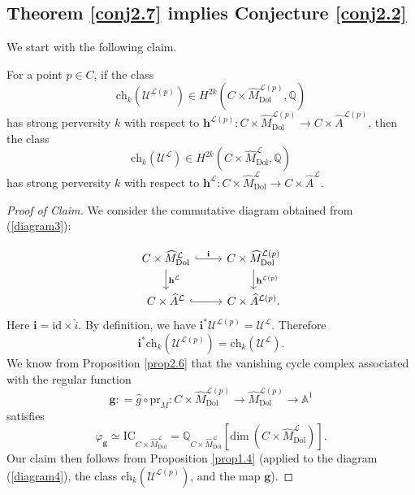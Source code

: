 \documentclass[11pt]{amsart}
\theoremstyle{plain}
\newtheorem{prop}[thm]{Proposition}
\theoremstyle{definition}
\theoremstyle{remark}
\newcommand{\BA}{{\mathbb{A}}}
\newcommand{\BQ}{{\mathbb{Q}}}
\newcommand{\CL}{{\mathcal L}}
\newcommand{\CU}{{\mathcal U}}
\begin{document}
\subsection{Theorem \ref{conj2.7} implies Conjecture \ref{conj2.2}}\label{Sec2.3} We start with the following claim.


\medskip
{} For a point $p\in C$, if the class
\[
\mathrm{ch}_k(\CU^{\CL(p)}) \in H^{2k}(C\times \widehat{M}^{\CL(p)}_{\mathrm{Dol}}, \BQ) 
\]
has strong perversity $k$ with respect to $\mathbf{h}^{\CL(p)}: C\times \widehat{M}^{\CL(p)}_{\mathrm{Dol}} \to C\times \widehat{A}^{\CL(p)}$, then the class
\[
\mathrm{ch}_k(\CU^{\CL}) \in H^{2k}(C\times \widehat{M}^{\CL}_{\mathrm{Dol}}, \BQ)
\]
has strong perversity $k$ with respect to $\mathbf{h}^{\CL}: C\times \widehat{M}^\CL_{\mathrm{Dol}} \to C\times \widehat{A}^\CL$.

\begin{proof}[Proof of Claim]

We consider the commutative diagram obtained from (\ref{diagram3}):

\begin{equation}\label{diagram4}
\begin{tikzcd}
C \times \widehat{M}^\CL_{\mathrm{Dol}}\arrow[r,hook, "\mathbf{i}"] \arrow[d, "\mathbf{h}^\CL"]
&C\times \widehat{M}^{\CL(p)}_{\mathrm{Dol}} \arrow[d, "\mathbf{h}^{\CL(p)}"] \\
C\times \widehat{A}^\CL \arrow[r,hook]
& C\times \widehat{A}^{\CL(p)}.
\end{tikzcd}
\end{equation}
Here $\mathbf{i} = \mathrm{id} \times \widehat{i}$. By definition,  we have $\mathbf{i}^* \CU^{\CL(p)} = \CU^{\CL}$. Therefore 
\[
\mathbf{i}^* \mathrm{ch}_k(\CU^{\CL(p)}) = \mathrm{ch}_k(\CU^\CL).
\]
We know from Proposition \ref{prop2.6} that the vanishing cycle complex associated with the regular function
\[
\mathbf{g}: =  \widehat{g} \circ \mathrm{pr}_M: C\times \widehat{M}^{\CL(p)}_{\mathrm{Dol}} \to\widehat{M}^{\CL(p)}_{\mathrm{Dol}}\to \BA^1
\]
satisfies
\[
\varphi_{\mathbf{g}} \simeq \mathrm{IC}_{C\times \widehat{M}^{\CL}_{\mathrm{Dol}}} = {\BQ}_{C\times \widehat{M}^{\CL}_{\mathrm{Dol}}}\left[\mathrm{dim}~ (C\times \widehat{M}^{\CL}_{\mathrm{Dol}})\right].
\]
Our claim then follows from Proposition \ref{prop1.4} (applied to the diagram (\ref{diagram4}), the class $\mathrm{ch}_k(\CU^{\CL(p)})$, and the map $\mathbf{g}$).
\end{proof}
\end{document}
